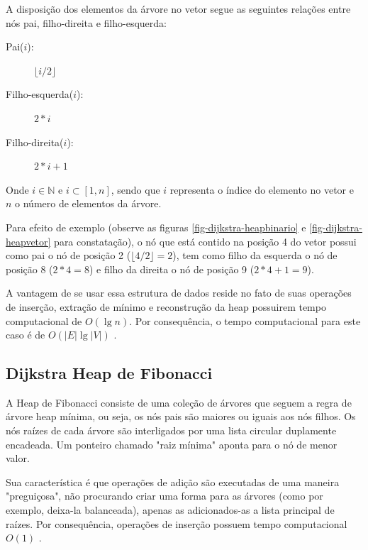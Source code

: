 A disposição dos elementos da árvore no vetor segue as seguintes relações entre nós pai, filho-direita e filho-esquerda:
\begin{description}
\item[Pai($i$):] $\lfloor i/2 \rfloor$
\item[Filho-esquerda($i$):] $2*i$
\item[Filho-direita($i$):] $2*i+1$
\end{description}
Onde $i \in \mathbb{N}$ e $i \subset [1, n]$, sendo que $i$ representa o índice do elemento no vetor e $n$ o número de elementos da árvore.

 Para efeito de exemplo (observe as figuras \ref{fig-dijkstra-heapbinario} e \ref{fig-dijkstra-heapvetor} para constatação), o nó que está contido na posição 4 do vetor possui como pai o nó de posição 2 ($\lfloor 4 / 2 \rfloor = 2$), tem como filho da esquerda o nó de posição 8 ($2*4 = 8$) e filho da direita o nó de posição 9 ($2*4+1 = 9$).


A vantagem de se usar essa estrutura de dados reside no fato de suas operações de inserção, extração de mínimo e reconstrução da heap possuirem tempo computacional de $O(\lg n)$. Por consequência, o tempo computacional para este caso é de $O(|E| \lg |V|)$ \cite{cormen2009introduction}.

\subsection{Dijkstra Heap de Fibonacci}
\label{sec-dijkstra-versoes-fibonacci}
A Heap de Fibonacci consiste de uma coleção de árvores que seguem a regra de árvore heap mínima, ou seja, os nós pais são maiores ou iguais aos nós filhos. Os nós raízes de cada árvore são interligados por uma lista circular duplamente encadeada. Um ponteiro chamado "raiz mínima" aponta para o nó de menor valor.

Sua característica é que operações de adição são executadas de uma maneira "preguiçosa", não procurando criar uma forma para as árvores (como por exemplo, deixa-la balanceada), apenas as adicionados-as a lista principal de raízes. Por consequência, operações de inserção possuem tempo computacional $O(1)$ \cite{cormen2009introduction}.

